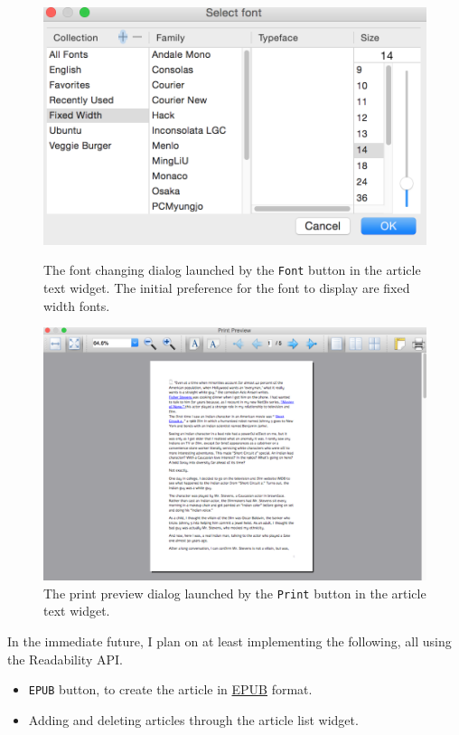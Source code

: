 \documentclass[]{article}
\begin{document}
\begin{figure}[!ht]
  \begin{minipage}[!ht]{0.3\linewidth}
   \includegraphics[width=\linewidth]{images/gui2_screenshot_fontdialog.png}
    \caption{The font changing dialog launched by the \texttt{Font} button in the article text widget. The initial preference for the font to display are fixed width fonts.} \label{fig:gui2_screenshot_fontdialog}
  \end{minipage} \hfill
  \begin{minipage}[!ht]{0.6\linewidth}
   \includegraphics[width=\linewidth]{images/gui2_screenshot_printpreviewdialog.png}
    \caption{The print preview dialog launched by the \texttt{Print} button in the article text widget.} \label{fig:gui2_screenshot_printpreviewdialog}
  \end{minipage}
\end{figure}
In the immediate future, I plan on at least implementing the following, all using the Readability API.
\begin{itemize}
  \item {\verb|EPUB|} button, to create the article in \href{https://en.wikipedia.org/wiki/EPUB}{EPUB} format.
  
  \item Adding and deleting articles through the article list widget.
\end{itemize}
\end{document}
